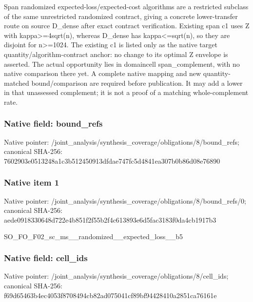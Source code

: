 \documentclass[10pt,a4paper]{article}
\begin{document}
\begingroup\raggedright\sloppy Span randomized expected-loss/\allowbreak{}expected-cost algorithms are a restricted subclass of the same unrestricted randomized contract,\allowbreak{} giving a concrete lower-transfer route on source D\_\allowbreak{}dense after exact contract verification. Existing span c1 uses Z with kappa>=\allowbreak{}4sqrt(n),\allowbreak{} whereas D\_\allowbreak{}dense has kappa<=\allowbreak{}sqrt(n),\allowbreak{} so they are disjoint for n>=\allowbreak{}1024. The existing c1 is listed only as the native target quantity/\allowbreak{}algorithm-contract anchor:\allowbreak{} no change to its optimal Z envelope is asserted. The actual opportunity lies in domaincell span\_\allowbreak{}complement,\allowbreak{} with no native comparison there yet. A complete native mapping and new quantity-matched bound/\allowbreak{}comparison are required before publication. It may add a lower in that unassessed complement;\allowbreak{} it is not a proof of a matching whole-complement rate.\par\endgroup

\subsubsection{Native field: bound\_\allowbreak{}refs}
Native pointer: /joint\_\allowbreak{}analysis/synthesis\_\allowbreak{}coverage/obligations/8/bound\_\allowbreak{}refs; canonical SHA-256: 7602903e0513248a1c3b512450913dfdae747fc5d4841ea307b0b86d08e76890

\subsubsection{Native item 1}
Native pointer: /joint\_\allowbreak{}analysis/synthesis\_\allowbreak{}coverage/obligations/8/bound\_\allowbreak{}refs/0; canonical SHA-256: aede0918330648d722e4b851f2f55b2f4c613893e6d5fac3183f0da4cb1917b3

\begingroup\raggedright\sloppy SO\_\allowbreak{}FO\_\allowbreak{}F02\_\allowbreak{}sc\_\allowbreak{}ms\_\allowbreak{}\_\allowbreak{}randomized\_\allowbreak{}\_\allowbreak{}expected\_\allowbreak{}loss\_\allowbreak{}\_\allowbreak{}b5\par\endgroup

\subsubsection{Native field: cell\_\allowbreak{}ids}
Native pointer: /joint\_\allowbreak{}analysis/synthesis\_\allowbreak{}coverage/obligations/8/cell\_\allowbreak{}ids; canonical SHA-256: f69d65463b4ec4053f8708494cb82ad075041cf89bf94428410a2851ca76161e
\end{document}
